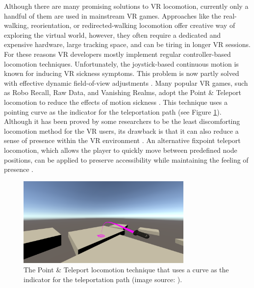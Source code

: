 Although there are many promising solutions to VR locomotion, currently only a handful of them are used in mainstream VR games. Approaches like the real-walking, reorientation, or redirected-walking locomotion offer creative way of exploring the virtual world, however, they often require a dedicated and expensive hardware, large tracking space, and can be tiring in longer VR sessions. For these reasons VR developers mostly implement regular controller-based locomotion techniques. Unfortunately, the joystick-based continuous motion is known for inducing VR sickness symptoms. This problem is now partly solved with effective dynamic field-of-view adjustments \cite{DYNAMICFOD}. Many popular VR games, such as Robo Recall, Raw Data, and Vanishing Realms, adopt the Point \& Teleport locomotion to reduce the effects of motion sickness \cite{TELEPORTATIONGAMES}. This technique uses a pointing curve as the indicator for the teleportation path (see Figure \ref{fig:TELEPORTATIONCURVEIMAGE}). Although it has been proved by some researchers to be the least discomforting locomotion method for the VR users, its drawback is that it can also reduce a sense of presence within the VR environment \cite{TELEPORTATIONEFFECTS}. An alternative fixpoint teleport locomotion, which allows the player to quickly move between predefined node positions, can be applied to preserve accessibility while maintaining the feeling of presence \cite{NODEBASEDTELEPORTATION}.

\begin{figure}[th]
\centering
\includegraphics[width=0.77\textwidth]{img/teleportation_curve.png}
\caption{The Point \& Teleport locomotion technique that uses a curve as the indicator for the teleportation path (image source: \cite{TELEPORTATIONCURVE}).}
\label{fig:TELEPORTATIONCURVEIMAGE}
\end{figure}

